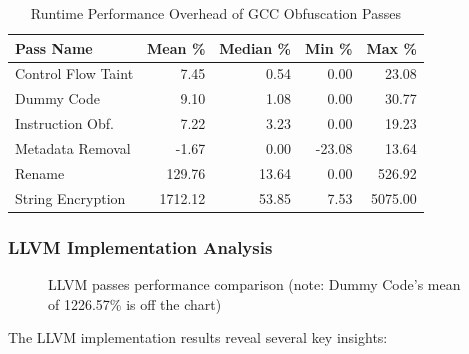 \documentclass[conference]{IEEEtran}
\begin{document}
\begin{table}[ht!]
\centering
\footnotesize
\caption{Runtime Performance Overhead of GCC Obfuscation Passes}
\begin{tabular}{|l|r|r|r|r|}
\hline
\textbf{Pass Name} & \textbf{Mean \%} & \textbf{Median \%} & \textbf{Min \%} & \textbf{Max \%} \\
\hline
Control Flow Taint & 7.45 & 0.54 & 0.00 & 23.08 \\
Dummy Code & 9.10 & 1.08 & 0.00 & 30.77 \\
Instruction Obf. & 7.22 & 3.23 & 0.00 & 19.23 \\
Metadata Removal & -1.67 & 0.00 & -23.08 & 13.64 \\
Rename & 129.76 & 13.64 & 0.00 & 526.92 \\
String Encryption & 1712.12 & 53.85 & 7.53 & 5075.00 \\
\hline
\end{tabular}
\label{tab:gcc-runtime-overhead}
\end{table}

\subsubsection{LLVM Implementation Analysis}

\begin{figure}[ht!]
\centering
{}
\caption{LLVM passes performance comparison (note: Dummy Code's mean of 1226.57\% is off the chart)}
\label{fig:llvm-overhead}
\end{figure}

The LLVM implementation results reveal several key insights:
\end{document}
